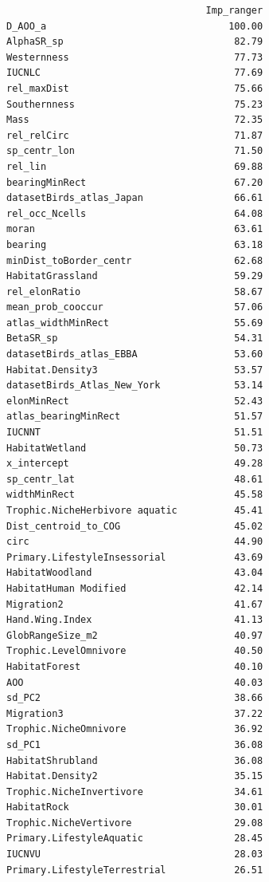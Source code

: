 \documentclass[
  letterpaper,
  DIV=11,
  numbers=noendperiod]{scrreprt}
\begin{document}
\begin{verbatim}
                                   Imp_ranger
D_AOO_a                                100.00
AlphaSR_sp                              82.79
Westernness                             77.73
IUCNLC                                  77.69
rel_maxDist                             75.66
Southernness                            75.23
Mass                                    72.35
rel_relCirc                             71.87
sp_centr_lon                            71.50
rel_lin                                 69.88
bearingMinRect                          67.20
datasetBirds_atlas_Japan                66.61
rel_occ_Ncells                          64.08
moran                                   63.61
bearing                                 63.18
minDist_toBorder_centr                  62.68
HabitatGrassland                        59.29
rel_elonRatio                           58.67
mean_prob_cooccur                       57.06
atlas_widthMinRect                      55.69
BetaSR_sp                               54.31
datasetBirds_atlas_EBBA                 53.60
Habitat.Density3                        53.57
datasetBirds_Atlas_New_York             53.14
elonMinRect                             52.43
atlas_bearingMinRect                    51.57
IUCNNT                                  51.51
HabitatWetland                          50.73
x_intercept                             49.28
sp_centr_lat                            48.61
widthMinRect                            45.58
Trophic.NicheHerbivore aquatic          45.41
Dist_centroid_to_COG                    45.02
circ                                    44.90
Primary.LifestyleInsessorial            43.69
HabitatWoodland                         43.04
HabitatHuman Modified                   42.14
Migration2                              41.67
Hand.Wing.Index                         41.13
GlobRangeSize_m2                        40.97
Trophic.LevelOmnivore                   40.50
HabitatForest                           40.10
AOO                                     40.03
sd_PC2                                  38.66
Migration3                              37.22
Trophic.NicheOmnivore                   36.92
sd_PC1                                  36.08
HabitatShrubland                        36.08
Habitat.Density2                        35.15
Trophic.NicheInvertivore                34.61
HabitatRock                             30.01
Trophic.NicheVertivore                  29.08
Primary.LifestyleAquatic                28.45
IUCNVU                                  28.03
Primary.LifestyleTerrestrial            26.51

\end{verbatim}
\end{document}
